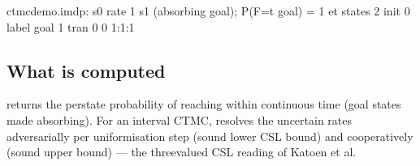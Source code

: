 \documentclass[a4paper,10pt,english]{sphinxmanual}
\begin{document}
\begin{sphinxVerbatim}[commandchars=\\\{\}]
\PYGZsh{} ctmc\PYGZus{}demo.imdp: s0 \PYGZhy{}\PYGZhy{}rate 1\PYGZhy{}\PYGZhy{}\PYGZgt{} s1 (absorbing goal); P(F\PYGZlt{}=t goal) = 1 \PYGZhy{} e\PYGZca{}\PYGZob{}\PYGZhy{}t\PYGZcb{}
states 2
init 0
label goal 1
tran 0 0 1:1:1
\end{sphinxVerbatim}


\subsection{What is computed}
\label{\detokenize{manual/ctmc-csl:what-is-computed}}
\sphinxAtStartPar
{} returns the per\sphinxhyphen{}state probability of reaching  within
continuous time  (goal states made absorbing). For an interval CTMC, 
resolves the uncertain rates adversarially per uniformisation step (sound lower CSL
bound) and  cooperatively (sound upper bound) — the three\sphinxhyphen{}valued CSL
reading of Katoen et al.
\end{document}
